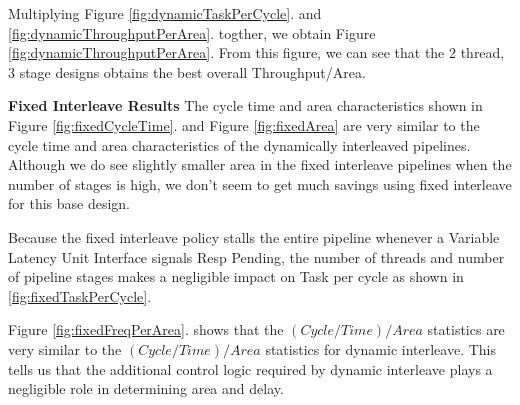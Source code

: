 Multiplying Figure \ref{fig:dynamicTaskPerCycle}. and \ref{fig:dynamicThroughputPerArea}. togther, we obtain Figure \ref{fig:dynamicThroughputPerArea}. From this figure, we can see that the 2 thread, 3 stage designs obtains the best overall Throughput/Area.

{\bf Fixed Interleave Results}
The cycle time and area characteristics shown in Figure \ref{fig:fixedCycleTime}. and Figure \ref{fig:fixedArea} are very similar to the cycle time and area characteristics of the dynamically interleaved pipelines. Although we do see slightly smaller area in the fixed interleave pipelines when the number of stages is high, we don't seem to get much savings using fixed interleave for this base design.

Because the fixed interleave policy stalls the entire pipeline whenever a Variable Latency Unit Interface signals Resp Pending, the number of threads and number of pipeline stages makes a negligible impact on Task per cycle as shown in \ref{fig:fixedTaskPerCycle}.

Figure \ref{fig:fixedFreqPerArea}. shows that the $(Cycle/Time)/Area$ statistics are very similar to the $(Cycle/Time)/Area$ statistics for dynamic interleave. This tells us that the additional control logic required by dynamic interleave plays a negligible role in determining area and delay.

